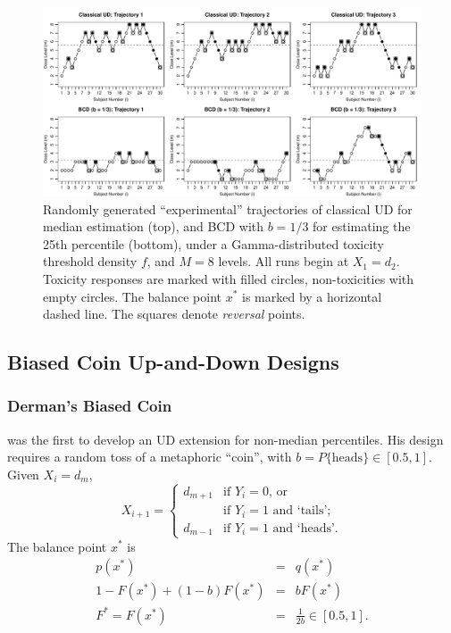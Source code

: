 \begin{figure}
\begin{center}
\includegraphics[scale=0.65]{Traject2}
\caption{Randomly generated ``experimental'' trajectories of classical UD for median estimation (top), and BCD with $b=1/3$ for estimating the 25th percentile (bottom), under a Gamma-distributed toxicity threshold density $f$, and $M=8$ levels. All runs begin at $X_1=d_2$. Toxicity responses are marked with filled circles, non-toxicities with empty circles. The balance point $x^*$ is marked by a horizontal dashed line. The squares denote \emph{reversal} points.}\label{fig:traject}
\end{center}
\end{figure}

\subsection{Biased Coin Up-and-Down Designs}

\subsubsection{Derman's Biased Coin}
\cite{Derm:Nonp:1957} was the first to develop an UD extension for non-median percentiles. His design requires a random toss of a metaphoric ``coin'', with $b=P\{\textrm{heads}\}\in[0.5,1]$. Given $X_i=d_m$,
\begin{equation*}
X_{i+1}=
\begin{cases}
d_{m+1} &\textrm{if $Y_i=0$, or}\\
& \textrm{if $Y_i=1$ and `tails'; }\\
d_{m-1} &\textrm{if $Y_i=1$ and `heads'.}
\end{cases}
\end{equation*}
The balance point $x^*$ is
\begin{equation}\label{eq:dermanx*}
\begin{array}{rcl}
p(x^*)&=&q(x^*)\\
1-F\left(x^*\right)+(1-b)F\left(x^*\right) &=& bF\left(x^*\right)\\
F^*=F\left(x^*\right) &=& \frac{1}{2b}\in[0.5,1].
\end{array}
\end{equation}

